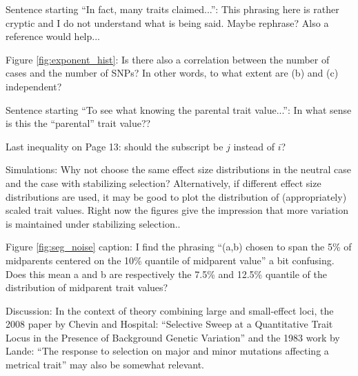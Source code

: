 \reply{
}

\begin{point}{\revref}
    Sentence starting ``In fact, many traits claimed...'': This phrasing here is rather cryptic and I do not understand what is being said. Maybe rephrase? Also a reference would help...
\end{point}

\reply{
}

\begin{point}{}
    Figure \ref{fig:exponent_hist}: Is there also a correlation between the number of cases and the number of SNPs? In other words, to what extent are (b) and (c) independent?
\end{point}

\reply{
}

\begin{point}{\revref}
    Sentence starting ``To see what knowing the parental trait value...'': In what sense is this the ``parental'' trait value??
\end{point}

\reply{
}

\begin{point}{}
    Last inequality on Page 13: should the subscript be $j$ instead of $i$?
\end{point}

\reply{
}

\begin{point}{}
    Simulations: Why not choose the same effect size distributions in the neutral case and the case with stabilizing selection? Alternatively, if different effect size distributions are used, it may be good to plot the distribution of (appropriately) scaled trait values. Right now the figures give the impression that more variation is maintained under stabilizing selection..
\end{point}

\reply{
}

\begin{point}{}
    Figure \ref{fig:seg_noise} caption: I find the phrasing ``(a,b) chosen to span the 5\% of midparents centered on the 10\% quantile of midparent value'' a bit confusing. Does this mean a and b are respectively the 7.5\% and 12.5\% quantile of the distribution of midparent trait values?
\end{point}

\reply{
}

\begin{point}{}
    Discussion: In the context of theory combining large and small-effect loci, the 2008 paper by Chevin and Hospital: ``Selective Sweep at a Quantitative Trait Locus in the Presence of Background Genetic Variation'' and the 1983 work by Lande: ``The response to selection on major and minor mutations affecting a metrical trait'' may also be somewhat relevant.
\end{point}

